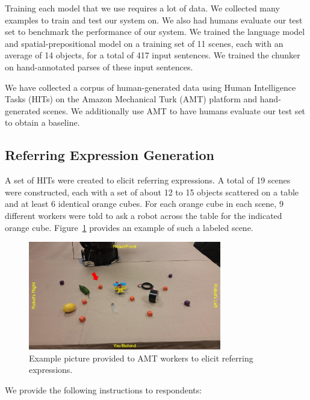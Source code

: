 \documentclass[letterpaper,10pt]{article}
\begin{document}
Training each model that we use requires a lot of data. We collected many examples to train and test our system on. We also had humans evaluate our test set to benchmark the performance of our system. We trained the language model and spatial-prepositional model on a training set of 11 scenes, each with an average of 14 objects, for a total of 417 input sentences. We trained the chunker on hand-annotated parses of these input sentences.

We have collected a corpus of human-generated data using Human Intelligence Tasks (HITs) on the Amazon Mechanical Turk (AMT) platform and hand-generated scenes. We additionally use AMT to have humans evaluate our test set to obtain a baseline.

 \subsection{Referring Expression Generation}
A set of HITs were created to elicit referring expressions. A total of 19 scenes were constructed, each with a set of about 12 to 15 objects scattered on a table and at least 6 identical orange cubes. For each orange cube in each scene, 9 different workers were told to ask a robot across the table for the indicated orange cube. Figure~\ref{fig:ref_expr_examples_pic} provides an example of such a labeled scene.

\begin{figure}[htb]
  \centering
    \includegraphics[width=0.75\textwidth]{ref_expr_examples_pic}
  \caption{Example picture provided to AMT workers to elicit referring expressions.}
  \label{fig:ref_expr_examples_pic}
\end{figure}

We provide the following instructions to respondents:
\end{document}
